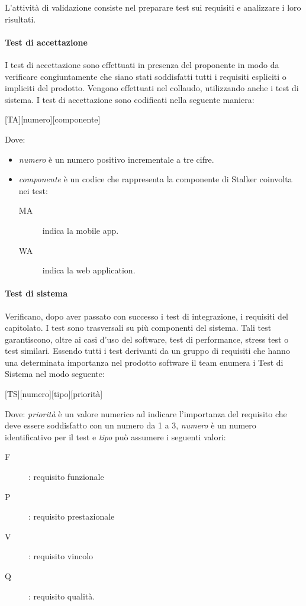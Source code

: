 \documentclass[../../norme-di-progetto.tex]{subfiles}
\begin{document}
L'attività di validazione consiste nel preparare test sui requisiti e analizzare i loro risultati.

\paragraph{Test di accettazione}
\label{par:test_di_accettazione}

I test di accettazione sono effettuati in presenza del proponente in modo da verificare congiuntamente che siano stati soddisfatti tutti i requisiti espliciti o impliciti del prodotto.
Vengono effettuati nel collaudo, utilizzando anche i test di sistema.
I test di accettazione sono codificati nella seguente maniera:
\begin{center}
    [TA][numero][componente]
\end{center}
Dove:
\begin{itemize}
  \item \textit{numero} è un numero positivo incrementale a tre cifre.
  \item \textit{componente} è un codice che rappresenta la componente di Stalker coinvolta nei test:
    \begin{description}
      \item [MA] indica la mobile app.
      \item [WA] indica la web application.
    \end{description}
\end{itemize}

\paragraph{Test di sistema}
\label{par:test_di_sistema}

Verificano, dopo aver passato con successo i test di integrazione, i requisiti del capitolato. I test sono trasversali su più componenti del sistema.
Tali test garantiscono, oltre ai casi d'uso del software, test di performance, stress test o test similari.
Essendo tutti i test derivanti da un gruppo di requisiti che hanno una determinata importanza nel prodotto software il team enumera i Test di Sistema nel modo seguente:
\begin{center}
    [TS][numero][tipo][priorità]
\end{center}
Dove: \textit{priorità} è un valore numerico ad indicare l'importanza del requisito che deve essere soddisfatto con un numero da 1 a 3, \textit{numero} è un numero identificativo per il test e \textit{tipo} può assumere i seguenti valori:
\begin{description}
  \item [F]: requisito funzionale
  \item [P]: requisito prestazionale
  \item [V]: requisito vincolo
  \item [Q]: requisito qualità.
\end{description}
\end{document}
